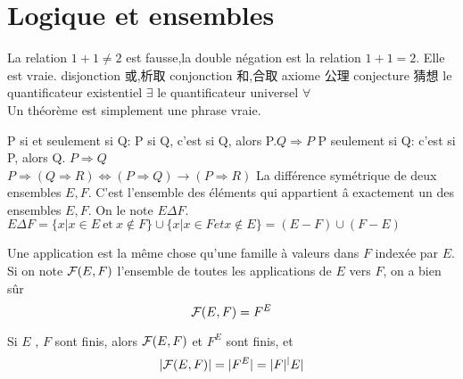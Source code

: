 
\chapter{Logique et ensembles}
La relation $1+1 \neq 2$ est fausse,la double n\'egation est la relation $1+1=2$. Elle est vraie.
\newline
disjonction 或,析取 \newline
conjonction 和,合取 \newline
axiome 公理 \newline
conjecture 猜想\newline
le quantificateur existentiel $\exists$ \newline
le quantificateur universel $\forall$ \newline
\\
Un th\'eor\`eme est simplement une phrase vraie. \newline

P si et seulement si Q: \newline
P si Q, c'est si Q, alors P.\quad $Q \Rightarrow P$ \newline
P seulement si Q: c'est si P, alors Q. \quad $P \Rightarrow Q$ \\
$P \Rightarrow (Q \Rightarrow R)\Leftrightarrow (P \Rightarrow Q)\rightarrow (P \Rightarrow R)$ \newline
La diff\'erence sym\'etrique de deux ensembles $E,F$.
C'est l'ensemble des \'el\'ements qui appartient \^a exactement un des ensembles $E,F$. On le note $E \Delta F$. \\
$
E \Delta F=\{x|x\in E ~\mathrm{et} ~x \not \in F\}\cup\{x|x\in F et x \not \in E\}=(E-F)\cup(F-E)
$

Une application est la m\^eme chose qu'une famille \`a valeurs dans $F$ index\'ee par $E$.
Si on note ${\cal F}(E,F)$ l'ensemble de toutes les applications de $E$ vers $F$, on a bien s\^ur
$$
{\cal F}(E,F)=F^E
$$

Si $E$ , $F$ sont finis, alors ${\cal F}(E,F)$ et $F^E$ sont finis, et
$$
|{\cal F}(E,F)|=|F^E|=|F|^|E|
$$

